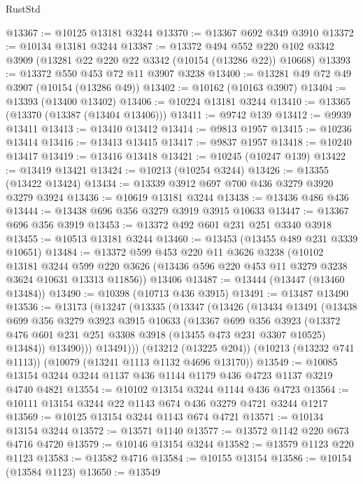 \begin{lexlean}{RustStd}
\begin{coremodule}
@13367 := @10125 @13181 @3244
@13370 := @13367 @692 @349 @3910
@13372 := @10134 @13181 @3244
@13387 := @13372
    @494
    @552
    @220
    @102
    @3342
    @3909
    (@13281 @22 @220 @22 @3342 (@10154 (@13286 @22)) @10668)
@13393 := @13372 @550 @453 @72 @11 @3907 @3238
@13400 := @13281 @49 @72 @49 @3907 (@10154 (@13286 @49))
@13402 := @10162 (@10163 @3907)
@13404 := @13393 (@13400 @13402)
@13406 := @10224 @13181 @3244
@13410 := @13365 (@13370 (@13387 (@13404 @13406)))
@13411 := @9742 @139
@13412 := @9939 @13411
@13413 := @13410 @13412
@13414 := @9813 @1957
@13415 := @10236 @13414
@13416 := @13413 @13415
@13417 := @9837 @1957
@13418 := @10240 @13417
@13419 := @13416 @13418
@13421 := @10245 (@10247 @139)
@13422 := @13419 @13421
@13424 := @10213 (@10254 @3244)
@13426 := @13355 (@13422 @13424)
@13434 := @13339 @3912 @697 @700 @436 @3279 @3920 @3279 @3924
@13436 := @10619 @13181 @3244
@13438 := @13436 @486 @436
@13444 := @13438 @696 @356 @3279 @3919 @3915 @10633
@13447 := @13367 @696 @356 @3919
@13453 := @13372 @492 @601 @231 @251 @3340 @3918
@13455 := @10513 @13181 @3244
@13460 := @13453 (@13455 @489 @231 @3339 @10651)
@13484 := @13372
    @599
    @453
    @220
    @11
    @3626
    @3238
    (@10102
      @13181
      @3244
      @599
      @220
      @3626
      (@13436 @596 @220 @453 @11 @3279 @3238 @3624 @10631 @13313 @11856))
    @13406
@13487 := @13444 (@13447 (@13460 @13484))
@13490 := @10398 (@10713 @436 @3915)
@13491 := @13487 @13490
@13536 := @13173
    (@13247
      (@13335
        (@13347
          (@13426
            (@13434
              @13491
              (@13438
                @699
                @356
                @3279
                @3923
                @3915
                @10633
                (@13367
                  @699
                  @356
                  @3923
                  (@13372 @476 @601 @231 @251 @3308 @3918 (@13455 @473 @231 @3307 @10525) @13484))
                @13490)))
          @13491)))
    (@13212 (@13225 @204))
    (@10213 (@13232 @741 @1113))
    (@10079 (@13241 @1113 @1132 @4696 @13170))
@13549 := @10085 @13154 @3244 @3244 @1137 @436 @1144 @1179 @436 @4723 @1137 @3219 @4740 @4821
@13554 := @10102 @13154 @3244 @1144 @436 @4723
@13564 := @10111 @13154 @3244 @22 @1143 @674 @436 @3279 @4721 @3244 @1217
@13569 := @10125 @13154 @3244 @1143 @674 @4721
@13571 := @10134 @13154 @3244
@13572 := @13571 @1140
@13577 := @13572 @1142 @220 @673 @4716 @4720
@13579 := @10146 @13154 @3244
@13582 := @13579 @1123 @220 @1123
@13583 := @13582 @4716
@13584 := @10155 @13154
@13586 := @10154 (@13584 @1123)
@13650 := @13549

\end{coremodule}
\end{lexlean}
